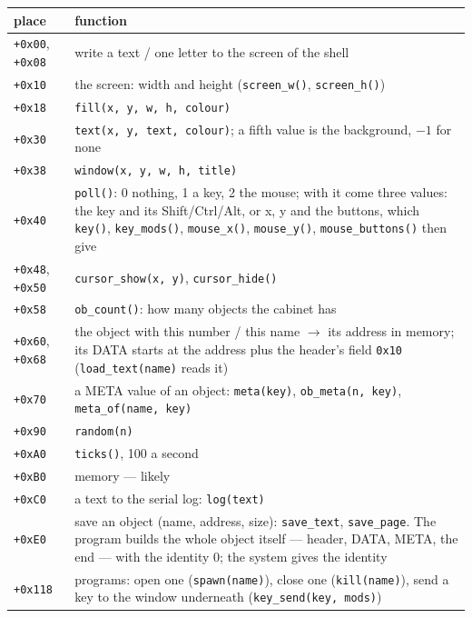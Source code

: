 \documentclass[11pt,a4paper]{article}
\begin{document}
\begin{longtable}{@{}l p{12cm}@{}}
\toprule
place & function \\ \midrule
\texttt{+0x00}, \texttt{+0x08} & write a text / one letter to the screen of the shell \\
\texttt{+0x10} & the screen: width and height (\texttt{screen\_w()}, \texttt{screen\_h()}) \\
\texttt{+0x18} & \texttt{fill(x, y, w, h, colour)} \\
\texttt{+0x30} & \texttt{text(x, y, text, colour)}; a fifth value is the background, $-1$ for none \\
\texttt{+0x38} & \texttt{window(x, y, w, h, title)} \\
\texttt{+0x40} & \texttt{poll()}: 0 nothing, 1 a key, 2 the mouse; with it come three values: the key
                 and its Shift/Ctrl/Alt, or x, y and the buttons, which \texttt{key()},
                 \texttt{key\_mods()}, \texttt{mouse\_x()}, \texttt{mouse\_y()},
                 \texttt{mouse\_buttons()} then give \\
\texttt{+0x48}, \texttt{+0x50} & \texttt{cursor\_show(x, y)}, \texttt{cursor\_hide()} \\
\texttt{+0x58} & \texttt{ob\_count()}: how many objects the cabinet has \\
\texttt{+0x60}, \texttt{+0x68} & the object with this number / this name $\to$ its address in memory;
                 its DATA starts at the address plus the header's field \texttt{0x10}
                 (\texttt{load\_text(name)} reads it) \\
\texttt{+0x70} & a META value of an object: \texttt{meta(key)}, \texttt{ob\_meta(n, key)},
                 \texttt{meta\_of(name, key)} \\
\texttt{+0x90} & \texttt{random(n)} \\
\texttt{+0xA0} & \texttt{ticks()}, 100 a second \\
\texttt{+0xB0} & memory --- likely \\
\texttt{+0xC0} & a text to the serial log: \texttt{log(text)} \\
\texttt{+0xE0} & save an object (name, address, size): \texttt{save\_text}, \texttt{save\_page}.
                 The program builds the whole object itself --- header, DATA, META, the end ---
                 with the identity 0; the system gives the identity \\
\texttt{+0x118} & programs: open one (\texttt{spawn(name)}), close one (\texttt{kill(name)}),
                 send a key to the window underneath (\texttt{key\_send(key, mods)}) \\

\end{longtable}
\end{document}
